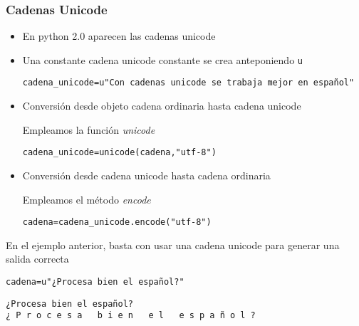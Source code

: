 \documentclass[ucs]{beamer}
\begin{document}
\begin{frame}[fragile]
\frametitle{Cadenas Unicode}
\begin{itemize}
\item
En python 2.0 aparecen las cadenas unicode
\item
Una constante cadena unicode constante se crea anteponiendo \verb|u|
  \begin{footnotesize}
  \begin{verbatim}
cadena_unicode=u"Con cadenas unicode se trabaja mejor en español"
  \end{verbatim}
  \end{footnotesize}
\item
Conversión desde objeto cadena ordinaria hasta cadena unicode

Empleamos la función \emph{unicode}
  \begin{footnotesize}
  \begin{verbatim}
cadena_unicode=unicode(cadena,"utf-8")
  \end{verbatim}
  \end{footnotesize}
\item
Conversión desde cadena unicode hasta cadena ordinaria

Empleamos el método \emph{encode}
  \begin{footnotesize}
  \begin{verbatim}
cadena=cadena_unicode.encode("utf-8")
  \end{verbatim}
  \end{footnotesize}



\end{itemize}
\end{frame}



\begin{frame}[fragile]

En el ejemplo anterior, basta con usar una cadena unicode para
generar una salida correcta

\verb|cadena=u"¿Procesa bien el español?"|

  \begin{footnotesize}
  \begin{verbatim}
¿Procesa bien el español?
¿ P r o c e s a   b i e n   e l   e s p a ñ o l ?
  \end{verbatim}
  \end{footnotesize}
 
\end{frame}
\end{document}
